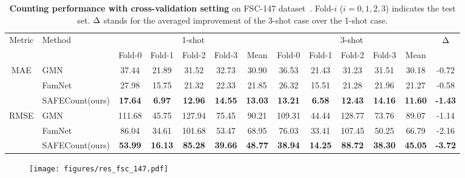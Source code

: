 \documentclass[10pt,twocolumn,letterpaper]{article}
\newcommand{\method}{SAFECount\xspace}
\begin{document}
\begin{table*}[!ht]
\caption{
    \textbf{Counting performance with cross-validation setting} on FSC-147 dataset~\cite{famnet}.
Fold-$i$ ($i=0,1,2,3$) indicates the test set.
$\rm \Delta$ stands for the averaged improvement of the 3-shot case over the 1-shot case. 
}
\centering
\scriptsize
\begin{threeparttable}
\begin{tabular}{cl|ccccc|ccccc|c}
\toprule
\multirow{2}{*}{Metric} & \multirow{2}{*}{Method} 
& \multicolumn{5}{c|}{1-shot} & \multicolumn{5}{c|}{3-shot} & \multirow{2}{*}{$\rm \Delta$} \\ 
& & Fold-0 & Fold-1 & Fold-2 & Fold-3 & Mean & Fold-0 & Fold-1 & Fold-2 & Fold-3 & Mean & \\ 
\midrule
\multirow{3}{*}{MAE} 
& GMN~\cite{gmn} & 37.44 & 21.89 & 31.52 & 32.73 & 30.90 & 36.53 & 21.43 & 31.23 & 31.51 & 30.18 & -0.72 \\
& FamNet~\cite{famnet} & 27.98 & 15.75 & 21.32 & 22.33 & 21.85 & 26.32 & 15.51 & 21.28 & 21.96 & 21.27 & -0.58 \\
\cmidrule{2-13}
& \method (ours) & \textbf{17.64} & \textbf{6.97} & \textbf{12.96} & \textbf{14.55} & \textbf{13.03} & \textbf{13.21} & \textbf{6.58} & \textbf{12.43} & \textbf{14.16} & \textbf{11.60} & \textbf{-1.43} \\
\midrule
\multirow{3}{*}{RMSE} 
& GMN~\cite{gmn} & 111.68 & 45.75 & 127.94 & 75.45 & 90.21 & 109.31 & 44.44 & 128.77 & 73.76 & 89.07 & -1.14 \\
& FamNet~\cite{famnet} & 86.04 & 34.61 & 101.68 & 53.47 & 68.95 & 76.03 & 33.41 & 107.45 & 50.25 & 66.79 & -2.16 \\
\cmidrule{2-13}
& \method (ours) & \textbf{53.99} & \textbf{16.13} & \textbf{85.28} & \textbf{39.66} & \textbf{48.77} & \textbf{38.94} & \textbf{14.25} & \textbf{88.72} & \textbf{38.30} & \textbf{45.05} & \textbf{-3.72} \\ 
\bottomrule
\end{tabular}
\end{threeparttable}
\vspace{-10pt}
\label{tab:fsc_cv}
\end{table*}


\begin{figure*}[!ht]
    \centering
    \texttt{[image: figures/res\_fsc\_147.pdf]}
    \vspace{-2pt}
    \label{fig:res_fsc}
    \vspace{-13pt}
\end{figure*}
\end{document}
